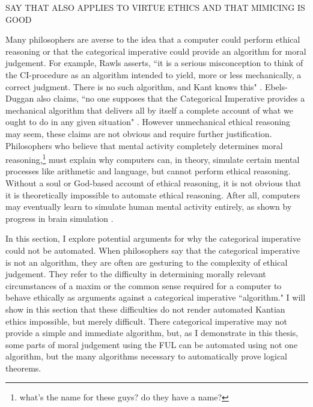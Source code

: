%
\begin{isabellebody}%
%
%
\isadelimtheory
%
\endisadelimtheory
%
\isatagtheory
%
\endisatagtheory
{\isafoldtheory}%
%
\isadelimtheory
%
\endisadelimtheory
%
\isadelimdocument
%
\endisadelimdocument
%
\isatagdocument
%
\isamarkuptrue%
%
\endisatagdocument
{\isafolddocument}%
%
\isadelimdocument
%
\endisadelimdocument
%
\begin{isamarkuptext}%
SAY THAT ALSO APPLIES TO VIRTUE ETHICS AND THAT MIMICING IS GOOD

Many philosophers are averse to the idea that a computer could perform ethical
reasoning or that the categorical imperative could provide an algorithm for
moral judgement. For example, Rawls asserts, ``it is a serious misconception to think of the CI-procedure 
as an algorithm intended to yield, more or less mechanically, a correct judgment. There is no such 
algorithm, and Kant knows this" \citep[166]{rawlslectures}. Ebels-Duggan also claims, ``no one supposes that the Categorical
Imperative provides a mechanical algorithm that delivers all by itself a complete account of what we 
ought to do in any given situation" \citep[174]{ebelsduggan}. However unmechanical ethical reasoning
may seem, these claims are not obvious and require further justification. Philosophers who believe 
that mental activity completely determines moral reasoning,\footnote{what's the name for these
guys? do they have a name?} must explain why computers can, in theory, simulate certain mental processes like arithmetic 
and language, but cannot perform ethical reasoning. Without a soul or God-based account of ethical reasoning, 
it is not obvious that it is theoretically impossible to automate ethical reasoning. After all, computers may eventually 
learn to simulate human mental activity entirely, as shown by progress in brain simulation \citep{brainsimulation}. 

In this section,
I explore potential arguments for why the categorical imperative could not be automated. When 
philosophers say that the categorical imperative is not an algorithm, they are often are gesturing to the complexity
of ethical judgement. They refer to the difficulty in determining morally relevant circumstances of a maxim or the common 
sense required for a computer to behave ethically as arguments against a categorical imperative ``algorithm." 
I will show in this section that these difficulties do not render automated Kantian ethics impossible, but 
merely difficult. There categorical imperative may not provide a simple and immediate algorithm, but, as
I demonstrate in this thesis, some parts of moral judgement using the FUL can be automated using not one
algorithm, but the many algorithms necessary to automatically prove logical theorems.


\end{isamarkuptext}
\end{isabellebody}
